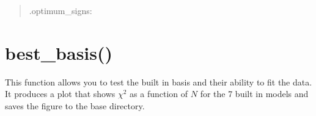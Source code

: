 \documentclass[letterpaper,10pt,english]{sphinxmanual}
\begin{document}
\begin{fulllineitems}
\begin{quote}
\begin{description}
\item[{.optimum\_signs: }] \leavevmode
{}

\end{description}
\end{quote}

\end{fulllineitems}



\section{best\_basis()}
\label{\detokenize{source/maxsmooth:module-maxsmooth.best_basis}}\label{\detokenize{source/maxsmooth:best-basis}}
This function allows you to test the built in basis and their ability to
fit the data. It produces a plot that shows \({\chi^2}\) as a function of
\({N}\) for the 7 built in models and saves the figure to the base directory.
\end{document}
